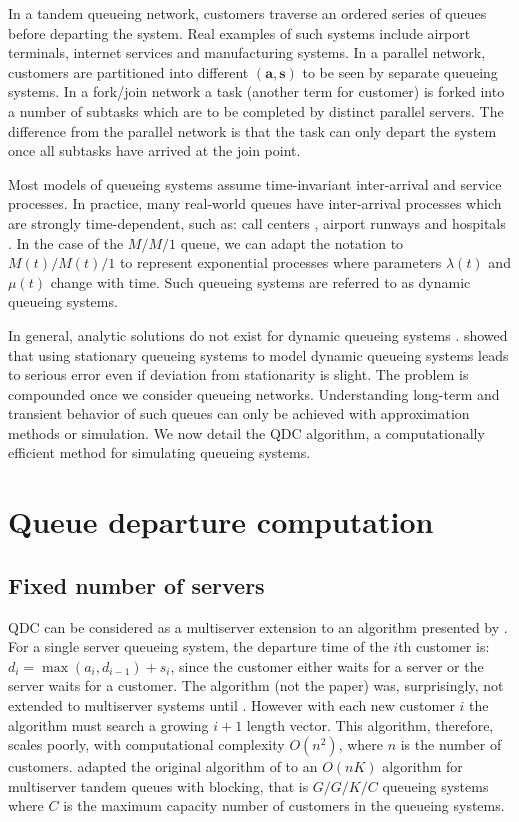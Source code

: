 \documentclass[article]{jss}
\begin{document}
In a tandem queueing network, customers traverse an ordered series of
queues before departing the system. Real examples of such systems
include airport terminals, internet services and manufacturing
systems. In a parallel network, customers are partitioned into
different $\mathbf{(a,s)}$ to be seen by separate queueing systems. In
a fork/join network a task (another term for customer) is forked into
a number of subtasks which are to be completed by distinct parallel
servers. The difference from the parallel network is that the task can
only depart the system once all subtasks have arrived at the join
point.

Most models of queueing systems assume time-invariant inter-arrival
and service processes. In practice, many real-world queues have
inter-arrival processes which are strongly time-dependent, such as:
call centers \citep{weinberg2007bayesian, brown2005statistical},
airport runways \citep{koopman1972air} and hospitals
\citep{brahimi_queueing_1991}. In the case of the $M/M/1$ queue, we
can adapt the notation to $M(t)/M(t)/1$ to represent exponential
processes where parameters $\lambda(t)$ and $\mu(t)$ change with
time. Such queueing systems are referred to as dynamic queueing
systems.

In general, analytic solutions do not exist for dynamic queueing
systems \citep{malone1995dynamic,
  worthington2009reflections}. \citet{green1991some} showed that using
stationary queueing systems to model dynamic queueing systems leads to
serious error even if deviation from stationarity is slight. The
problem is compounded once we consider queueing
networks. Understanding long-term and transient behavior of such
queues can only be achieved with approximation methods or
simulation. We now detail the QDC algorithm, a computationally
efficient method for simulating queueing systems.

\section{Queue departure computation} \label{sec:QDC}

\subsection{Fixed number of servers}

QDC can be considered as a multiserver extension to an algorithm
presented by \citet{lindley_theory_1952}. For a single server queueing
system, the departure time of the $i$th customer is:
$d_i = \max{(a_i, d_{i-1})} + s_i$, since the customer either waits
for a server or the server waits for a customer. The algorithm (not
the paper) was, surprisingly, not extended to multiserver systems
until \citet{krivulin_recursive_1994}. However with each new customer
$i$ the algorithm must search a growing $i+1$ length vector. This
algorithm, therefore, scales poorly, with computational complexity
$O(n^2)$, where $n$ is the number of
customers. \citet{kin_generalized_2010} adapted the original algorithm
of \citet{kiefer_theory_1955} to an $O(nK)$ algorithm for multiserver
tandem queues with blocking, that is $G/G/K/C$ queueing systems where
$C$ is the maximum capacity number of customers in the queueing
systems.
\end{document}
